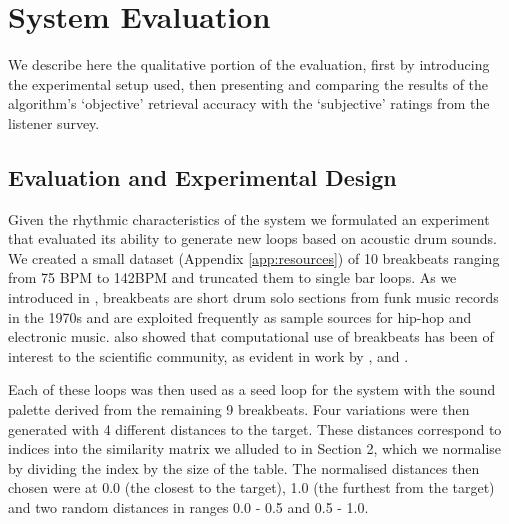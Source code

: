 
\section{System Evaluation}

We describe here the qualitative portion of the evaluation, first by introducing the experimental setup used, then presenting and comparing the results of the algorithm’s `objective' retrieval accuracy with the `subjective' ratings from the listener survey.

\subsection{Evaluation and Experimental Design}
\label{sec:break_evaluation}

Given the rhythmic characteristics of the system we formulated an experiment that evaluated its ability to generate new loops based on acoustic drum sounds. We created a small dataset (Appendix \ref{app:resources}) of 10 breakbeats ranging from 75 BPM to 142BPM and truncated them to single bar loops. As we introduced in , breakbeats are short drum solo sections from funk music records in the 1970s and are exploited frequently as sample sources for hip-hop and electronic music.  also showed that computational use of breakbeats has been of interest to the scientific community, as evident in work by \cite{Ravelli2007}, \cite{Hockman2015} and \cite{Collins2006}.

Each of these loops was then used as a seed loop for the system with the sound palette derived from the remaining 9 breakbeats. Four variations were then generated with 4 different distances to the target.  These distances correspond to indices into the similarity matrix we alluded to in Section 2, which we normalise by dividing the index by the size of the table. The normalised distances then chosen were at 0.0 (the closest to the target), 1.0 (the furthest from the target) and two random distances in ranges 0.0 - 0.5 and 0.5 - 1.0.


